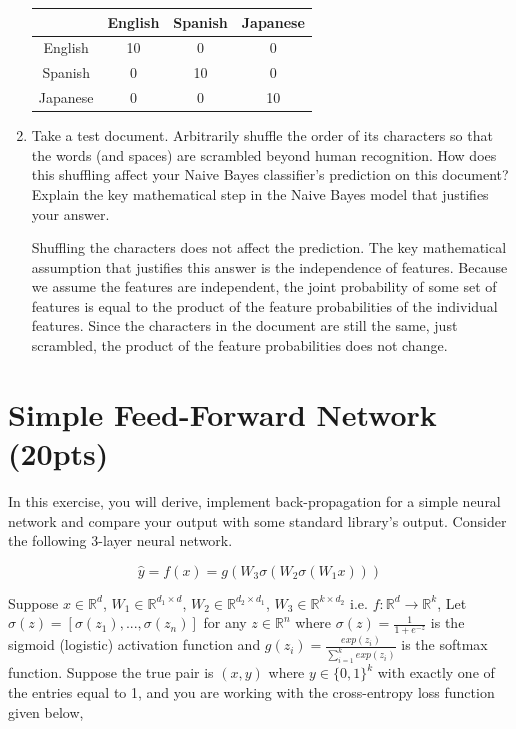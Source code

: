 \documentclass[a4paper]{article}
\theoremstyle{definition}
\newenvironment{soln}{
    \leavevmode\color{blue}\ignorespaces
}{}
\begin{document}
\begin{enumerate}
\begin{soln}
\begin{center}
\begin{tabular}{c|ccc}
& English & Spanish & Japanese \\
\hline
English & 10 & 0 & 0 \\
Spanish & 0 & 10 & 0 \\
Japanese & 0 & 0 & 10
\end{tabular}
\end{center}
\end{soln}

\item Take a test document.   Arbitrarily shuffle the order of its characters so that the words (and spaces) are scrambled beyond human recognition.  How does this shuffling affect your Naive Bayes classifier's prediction on this document?  Explain the key mathematical step in the Naive Bayes model that justifies your answer.

\begin{soln}
    Shuffling the characters does not affect the prediction.
    The key mathematical assumption that justifies this answer is the independence of features.
    Because we assume the features are independent, the joint probability of some set of features is equal to the product of the feature probabilities of the individual features.
    Since the characters in the document are still the same, just scrambled, the product of the feature probabilities does not change.
\end{soln}

\end{enumerate}

\section{Simple Feed-Forward Network (20pts)}
In this exercise, you will derive, implement back-propagation for a simple neural network and compare your output with some standard library’s output. Consider the following 3-layer neural network.

\[
\hat{y} = f(x) = g(W_3\sigma(W_2\sigma(W_1x)))
\]

Suppose $x \in \mathbb{R}^d$, $W_1 \in \mathbb{R}^{d_1 \times d}$, $W_2 \in \mathbb{R}^{d_2 \times d_1}$, $W_3 \in \mathbb{R}^{k \times d_2}$ i.e. $f: \mathbb{R}^d \rightarrow \mathbb{R}^k$, Let $\sigma(z) = [\sigma(z_1), ..., \sigma(z_n)]$ for any $z \in \mathbb{R}^n$ where $\sigma(z) = \frac{1}{1 + e^{-z}}$ is the sigmoid (logistic) activation function and $g(z_i) = \frac{exp(z_i)}{\sum_{i=1}^k exp(z_i)}$ is the softmax function. Suppose the true pair is $(x, y)$ where $y \in \{0, 1\}^k$ with exactly one of the entries equal to 1, and you are working with the cross-entropy loss function given below,
\end{document}
